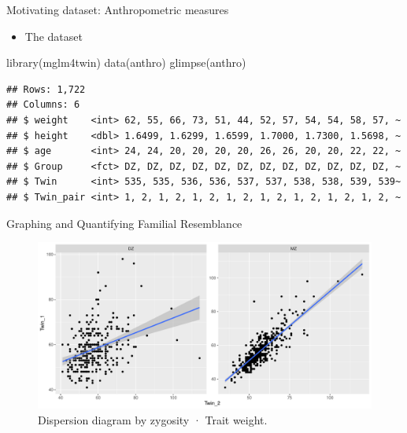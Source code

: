 \documentclass[
  ignorenonframetext,
  serif,
  professionalfont,
  usenames,
  dvipsnames,
  aspectratio = 169]{beamer}
\newenvironment{Shaded}{}{}
\newcommand{\FunctionTok}[1]{#1}
\newcommand{\NormalTok}[1]{#1}
\providecommand{\tightlist}{%
  \setlength{\itemsep}{0pt}\setlength{\parskip}{0pt}}
\renewcommand{\tightlist}{%
  \setlength{\itemsep}{0\baselineskip}
  \setlength{\parskip}{0.25\baselineskip}
}
\renewenvironment{Shaded}{
    \vspace{2pt}
    \begin{tcolorbox}[
      boxrule=0pt,      %
      colframe=gray!10, %
      colback=gray!10,  %
      sharp corners,
      left=3pt, right=3pt, top=3pt, bottom=3pt, %
      grow to right by=6pt,
      ]
    }{
    \end{tcolorbox}
    \vspace{-3pt}
    }
\begin{document}
\begin{frame}[fragile]{Motivating dataset: Anthropometric measures}
\protect\hypertarget{motivating-dataset-anthropometric-measures-1}{}
\begin{itemize}
\tightlist
\item
  The dataset
\end{itemize}

\begin{Shaded}
\begin{Highlighting}[]
\FunctionTok{library}\NormalTok{(mglm4twin)}
\FunctionTok{data}\NormalTok{(anthro)}
\FunctionTok{glimpse}\NormalTok{(anthro)}
\end{Highlighting}
\end{Shaded}

\begin{verbatim}
## Rows: 1,722
## Columns: 6
## $ weight    <int> 62, 55, 66, 73, 51, 44, 52, 57, 54, 54, 58, 57, ~
## $ height    <dbl> 1.6499, 1.6299, 1.6599, 1.7000, 1.7300, 1.5698, ~
## $ age       <int> 24, 24, 20, 20, 20, 20, 26, 26, 20, 20, 22, 22, ~
## $ Group     <fct> DZ, DZ, DZ, DZ, DZ, DZ, DZ, DZ, DZ, DZ, DZ, DZ, ~
## $ Twin      <int> 535, 535, 536, 536, 537, 537, 538, 538, 539, 539~
## $ Twin_pair <int> 1, 2, 1, 2, 1, 2, 1, 2, 1, 2, 1, 2, 1, 2, 1, 2, ~
\end{verbatim}
\end{frame}

\begin{frame}{Graphing and Quantifying Familial Resemblance}
\protect\hypertarget{graphing-and-quantifying-familial-resemblance}{}
\begin{figure}

{\centering \includegraphics[width=0.8\linewidth]{Slides_files/figure-beamer/unnamed-chunk-5-1} 

}

\caption{Dispersion diagram by zygosity · Trait weight.}\label{fig:unnamed-chunk-5}
\end{figure}
\end{frame}
\end{document}
